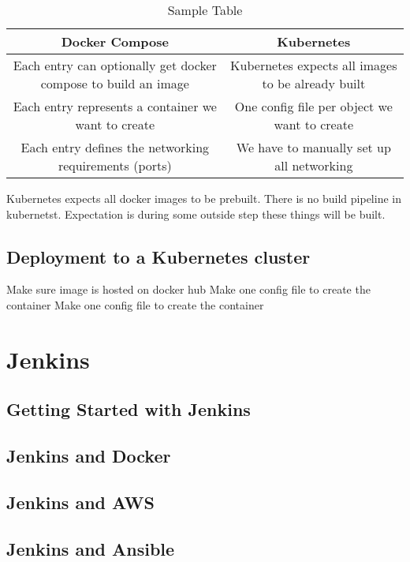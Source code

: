 \documentclass[a4paper, 11pt]{book}
\begin{document}
    \begin{table}[h]
        \centering
        \begin{tabular}{|c|c |}
            \hline
            Docker Compose                                                 & Kubernetes                                        \\
            \hline
            Each entry can optionally get docker compose to build an image & Kubernetes expects all images to be already built \\
            Each entry represents a container we want to create            & One config file per object we want to create      \\
            Each entry defines the networking requirements (ports)         & We have to manually set up all networking         \\
            \hline
        \end{tabular}
        \caption{Sample Table}
        \label{tab:sample}
    \end{table}

    Kubernetes expects all docker images to be prebuilt. There is no build pipeline in kubernetst.
    Expectation is during some outside step these things will be built.

    \subsection{Deployment to a Kubernetes cluster}
    Make sure image is hosted on docker hub
    Make one config file to create the container
    Make one config file to create the container



    \section{Jenkins}

    \subsection{Getting Started with Jenkins}
    \subsection{Jenkins and Docker}
    \subsection{Jenkins and AWS}
    \subsection{Jenkins and Ansible}
\end{document}
